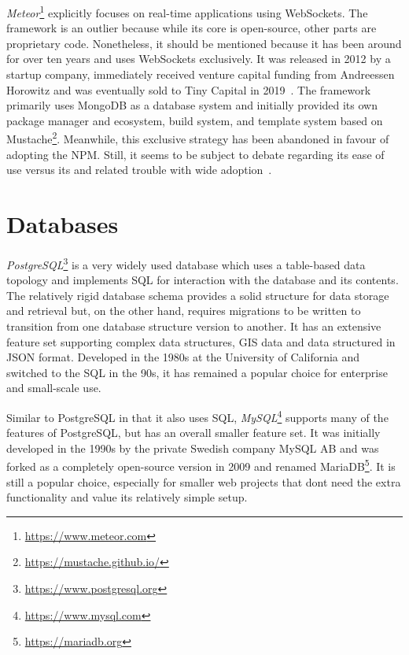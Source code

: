 \emph{Meteor}\footnote{\url{https://www.meteor.com}} explicitly focuses on real-time applications using WebSockets.
The framework is an outlier because while its core is open-source, other parts are proprietary code.
Nonetheless, it should be mentioned because it has been around for over ten years and uses WebSockets exclusively.
It was released in 2012 by a startup company, immediately received venture capital funding from Andreessen Horowitz and was eventually sold to Tiny Capital in 2019~\parencite{meteorSaleTinyCapital}.
The framework primarily uses MongoDB as a database system and initially provided its own package manager and ecosystem, build system, and template system based on Mustache\footnote{\url{https://mustache.github.io/}}.
Meanwhile, this exclusive strategy has been abandoned in favour of adopting the \ac{NPM}.
Still, it seems to be subject to debate regarding its ease of use versus its  and related trouble with wide adoption~\parencite{meteorDiscussionYCombinator}.

\section{Databases}
\label{sec:databases}



\emph{PostgreSQL}\footnote{\url{https://www.postgresql.org}} is a very widely used database which uses a table-based data topology and implements \ac{SQL} for interaction with the database and its contents.
The relatively rigid database schema provides a solid structure for data storage and retrieval but, on the other hand, requires migrations to be written to transition from one database structure version to another.
It has an extensive feature set supporting complex data structures, \ac{GIS} data and data structured in \ac{JSON} format.
Developed in the 1980s at the University of California and switched to the \ac{SQL} in the 90s, it has remained a popular choice for enterprise and small-scale use.

Similar to PostgreSQL in that it also uses \ac{SQL}, \emph{MySQL}\footnote{\url{https://www.mysql.com}} supports many of the features of PostgreSQL, but has an overall smaller feature set.
It was initially developed in the 1990s by the private Swedish company MySQL AB and was forked as a completely open-source version in 2009 and renamed MariaDB\footnote{\url{https://mariadb.org}}.
It is still a popular choice, especially for smaller web projects that don\textquotesingle t need the extra functionality and value its relatively simple setup.

